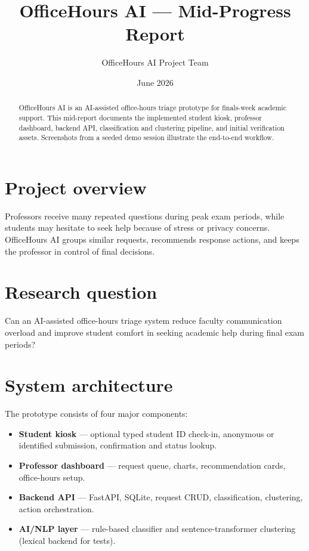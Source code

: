 \documentclass[11pt]{article}
\title{OfficeHours AI --- Mid-Progress Report}
\author{OfficeHours AI Project Team}
\date{June 2026}
\begin{document}
\maketitle

\begin{abstract}
OfficeHours AI is an AI-assisted office-hours triage prototype for finals-week
academic support. This mid-report documents the implemented student kiosk,
professor dashboard, backend API, classification and clustering pipeline, and
initial verification assets. Screenshots from a seeded demo session illustrate
the end-to-end workflow.
\end{abstract}

\section{Project overview}
Professors receive many repeated questions during peak exam periods, while
students may hesitate to seek help because of stress or privacy concerns.
OfficeHours AI groups similar requests, recommends response actions, and keeps
the professor in control of final decisions.

\section{Research question}
Can an AI-assisted office-hours triage system reduce faculty communication
overload and improve student comfort in seeking academic help during final exam
periods?

\section{System architecture}
The prototype consists of four major components:
\begin{itemize}
  \item \textbf{Student kiosk} --- optional typed student ID check-in, anonymous or identified submission, confirmation and status lookup.
  \item \textbf{Professor dashboard} --- request queue, charts, recommendation cards, office-hours setup.
  \item \textbf{Backend API} --- FastAPI, SQLite, request CRUD, classification, clustering, action orchestration.
  \item \textbf{AI/NLP layer} --- rule-based classifier and sentence-transformer clustering (lexical backend for tests).
\end{itemize}
\end{document}

